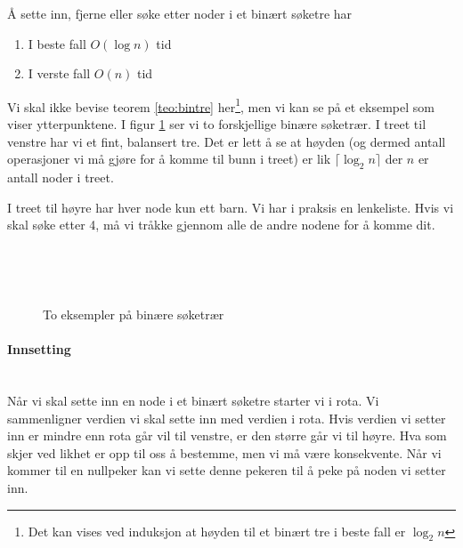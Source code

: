 \begin{teorem}
\label{teo:bintre}
Å sette inn, fjerne eller søke etter noder i et binært søketre har
\begin{enumerate}[i]
\item I beste fall $ O(\log n) $ tid
\item I verste fall $ O(n) $ tid
\end{enumerate}
\end{teorem}

Vi skal ikke bevise teorem \ref{teo:bintre} her\footnote{Det kan vises ved induksjon at høyden til et binært tre i beste fall er $ \log_2 n $}, men vi kan se på et eksempel som viser ytterpunktene. I figur \ref{fig:bintre} ser vi to forskjellige binære søketrær. I treet til venstre har vi et fint, balansert tre. Det er lett å se at høyden (og dermed antall operasjoner vi må gjøre for å komme til bunn i treet) er lik $ \lceil \log_2 n \rceil $ der $ n $ er antall noder i treet.

I treet til høyre har hver node kun ett barn. Vi har i praksis en lenkeliste. Hvis vi skal søke etter 4, må vi tråkke gjennom alle de andre nodene for å komme dit. 

\begin{figure}[H]
\caption{To eksempler på binære søketrær}
\label{fig:bintre}
\centering
~\\
$ \quad\quad $
\end{figure}




\paragraph{Innsetting}~\\
Når vi skal sette inn en node i et binært søketre starter vi i rota. Vi sammenligner verdien vi skal sette inn med verdien i rota. Hvis verdien vi setter inn er mindre enn rota går vil til venstre, er den større går vi til høyre. Hva som skjer ved likhet er opp til oss å bestemme, men vi må være konsekvente. Når vi kommer til en nullpeker kan vi sette denne pekeren til å peke på noden vi setter inn.

